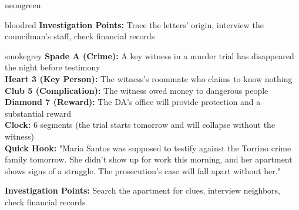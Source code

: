\documentclass[11pt]{article}
\begin{document}
\begin{noirsection}{neongreen}
\begin{casebox}{bloodred}
\textbf{Investigation Points:} Trace the letters' origin, interview the councilman's staff, check financial records
\end{casebox}

\begin{casebox}{smokegrey}
\textbf{Spade A (Crime):} A key witness in a murder trial has disappeared the night before testimony\\
\textbf{Heart 3 (Key Person):} The witness's roommate who claims to know nothing\\
\textbf{Club 5 (Complication):} The witness owed money to dangerous people\\
\textbf{Diamond 7 (Reward):} The DA's office will provide protection and a substantial reward\\
\textbf{Clock:} 6 segments (the trial starts tomorrow and will collapse without the witness)\\
\textbf{Quick Hook:} "Maria Santos was supposed to testify against the Torrino crime family tomorrow. She didn't show up for work this morning, and her apartment shows signs of a struggle. The prosecution's case will fall apart without her."

\textbf{Investigation Points:} Search the apartment for clues, interview neighbors, check financial records
\end{casebox}
\end{noirsection}

\newpage
\end{document}
